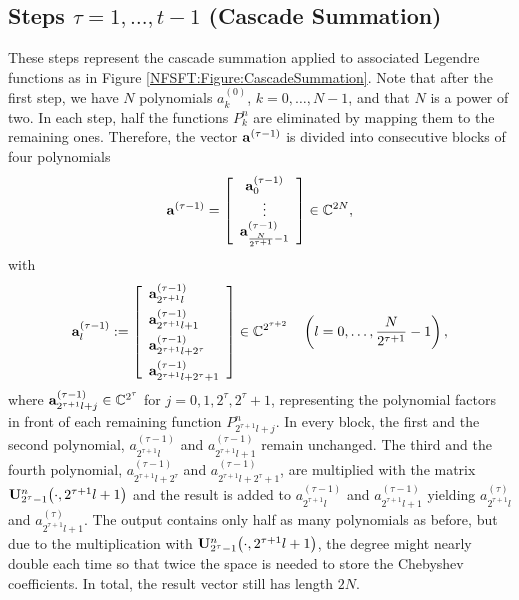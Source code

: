 \subsection[Cascade Summation]{Steps $\tau = 1,\ldots,t-1$ (Cascade Summation)}
These steps represent the cascade summation applied to associated Legendre functions as in Figure \ref{NFSFT:Figure:CascadeSummation}. Note that after the first step, we have $N$ polynomials $a_{k}^{(0)}$,
$k=0,\ldots,N-1$, and that $N$ is a power of two. In each step, half the functions $P_{k}^n$ are eliminated 
by mapping them to the remaining ones. Therefore, the vector $\mathbf{a}^{(\tau-1)}$ is divided into consecutive blocks of four polynomials
\[
  \mathbf{a}^{(\tau-1)} = 
    \left[\begin{array}{c}
      \mathbf{a}^{(\tau-1)}_{0}\\
      \vdots\\
      \mathbf{a}^{(\tau-1)}_{\frac{N}{2^{\tau+1}}-1}
    \end{array}\right]  \in \mathbb{C}^{2N},
\]
with
\begin{equation}
  \nonumber
  \mathbf{a}^{(\tau-1)}_{l} := 
    \left[\begin{array}{l}
      \mathbf{a}^{(\tau-1)}_{2^{\tau+1}l}\\[1ex]
      \mathbf{a}^{(\tau-1)}_{2^{\tau+1}l+1}\\[1ex]
      \mathbf{a}^{(\tau-1)}_{2^{\tau+1}l+2^{\tau}}\\[1ex]
      \mathbf{a}^{(\tau-1)}_{2^{\tau+1}l+2^{\tau}+1}
    \end{array}\right] \in \mathbb{C}^{2^{\tau+2}} \quad \left(l=0,\ldots,\frac{N}{2^{\tau+1}}-1\right),
\end{equation}
where $\mathbf{a}^{(\tau-1)}_{2^{\tau+1}l+j} \in \mathbb{C}^{2^{\tau}}$ for $j = 0,1,2^{\tau},2^{\tau}+1$, representing the polynomial 
factors in front of each remaining function $P_{2^{\tau+1}l+j}^n$. 
In every block, the first and the second polynomial, $a^{(\tau-1)}_{2^{\tau+1}l}$
and $a^{(\tau-1)}_{2^{\tau+1}l+1}$ remain unchanged. The third and the fourth polynomial, $a^{(\tau-1)}_{2^{\tau+1}l+2^{\tau}}$ 
and $a^{(\tau-1)}_{2^{\tau+1}l+2^{\tau}+1}$, are multiplied with the matrix $\mathbf{U}_{2^{\tau}-1}^{n}{\hspace{-0.4ex}}\left(\cdot,2^{\tau+1}l+1\right)$ 
and the result is added to $a^{(\tau-1)}_{2^{\tau+1}l}$ and $a^{(\tau-1)}_{2^{\tau+1}l+1}$ yielding $a^{(\tau)}_{2^{\tau+1}l}$ and $a^{(\tau)}_{2^{\tau+1}l+1}$. The output contains 
only half as many polynomials as before, but due to the multiplication with $\mathbf{U}_{2^{\tau}-1}^{n}{\hspace{-0.4ex}}\left(\cdot,2^{\tau+1}l+1\right)$, 
the degree might nearly double each time so that twice the space is needed to store the Chebyshev coefficients. In total, the result vector still has length $2N$. 
 

